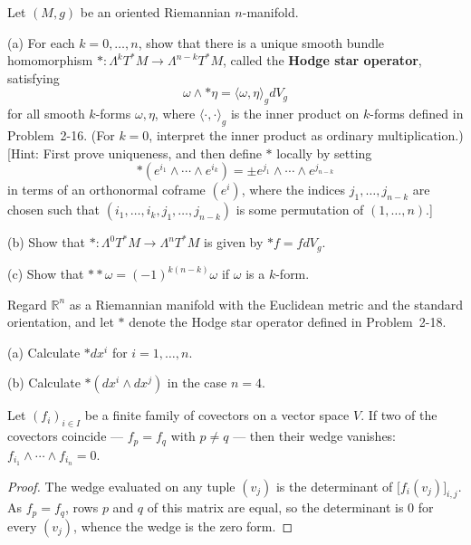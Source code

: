 \begin{exercise}\label{prob:hodge-star-operator}
\leanok
{}
Let $(M,g)$ be an oriented Riemannian $n$-manifold.

(a) For each $k = 0, \ldots, n$, show that there is a unique smooth bundle homomorphism $*: \Lambda^k T^* M \to \Lambda^{n-k}T^*M$, called the \textbf{Hodge star operator}, satisfying
\[
\omega \wedge *\eta = \langle\omega,\eta\rangle_g dV_g
\]
for all smooth $k$-forms $\omega, \eta$, where $\langle\cdot,\cdot\rangle_g$ is the inner product on $k$-forms defined in Problem~2-16. (For $k = 0$, interpret the inner product as ordinary multiplication.) [Hint: First prove uniqueness, and then define $*$ locally by setting
\[
*(e^{i_1} \wedge \cdots \wedge e^{i_k}) = \pm e^{j_1} \wedge \cdots \wedge e^{j_{n-k}}
\]
in terms of an orthonormal coframe $(e^i)$, where the indices $j_1,\ldots,j_{n-k}$ are chosen such that $(i_1,\ldots,i_k,j_1,\ldots,j_{n-k})$ is some permutation of $(1,\ldots,n)$.]

(b) Show that $*: \Lambda^0 T^*M \to \Lambda^n T^*M$ is given by $*f = f dV_g$.

(c) Show that $* * \omega = (-1)^{k(n-k)}\omega$ if $\omega$ is a $k$-form.
\end{exercise}

\begin{exercise}\label{prob:hodge-star-euclidean}
\leanok
{}
Regard $\mathbb{R}^n$ as a Riemannian manifold with the Euclidean metric and the standard orientation, and let $*$ denote the Hodge star operator defined in Problem~2-18.

(a) Calculate $* dx^i$ for $i = 1, \ldots, n$.

(b) Calculate $*(dx^i \wedge dx^j)$ in the case $n = 4$.
\end{exercise}

\begin{lemma}
\label{lem:wedge-covectors-repeat-zero}
\leanok
{}
Let $(f_i)_{i \in I}$ be a finite family of covectors on a vector space $V$. If two of the covectors coincide --- $f_p = f_q$ with $p \neq q$ --- then their wedge vanishes: $f_{i_1} \wedge \cdots \wedge f_{i_n} = 0$.
\end{lemma}
\begin{proof}
\leanok
The wedge evaluated on any tuple $(v_j)$ is the determinant of $\big[f_i(v_j)\big]_{i,j}$. As $f_p = f_q$, rows $p$ and $q$ of this matrix are equal, so the determinant is $0$ for every $(v_j)$, whence the wedge is the zero form.
\end{proof}

